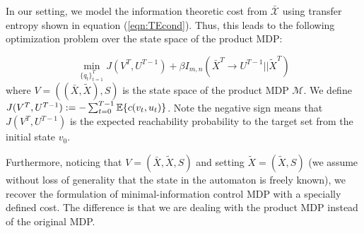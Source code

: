 




In our setting, we model the information theoretic cost from $\mathcal{\bar{X}}$ using transfer entropy shown in equation (\ref{eqn:TEcond}). Thus, this leads to the following optimization problem over the state space of the product MDP:

\begin{equation}\label{eqn:nonconstopt}
\min_{\{q_t\}_{t=1}^T} J(V^{T},U^{T-1}) + \beta I_{m,n}(\bar{X}^T \rightarrow U^{T-1}||\tilde{X}^T)
\end{equation}
where $V = ((\bar{X},\tilde{X}),S)$ is the state space of the product MDP $\mathcal{M}$. We define $J(V^T,U^{T-1}) := - \sum_{t=0}^{T-1}{\mathbb{E}\{c(v_t,u_t)\}}$. Note the negative sign means that $J(V^T,U^{T-1})$ is the expected reachability probability to the target set from the initial state $v_0$.

Furthermore, noticing that $V = (\bar{X},\tilde{X},S)$ and setting $\tilde{X} = (\tilde{X},S)$ (we assume without loss of generality that the state in the automaton is freely known), we recover the formulation of minimal-information control MDP with a specially defined cost. The difference is that we are dealing with the product MDP instead of the original MDP. 


